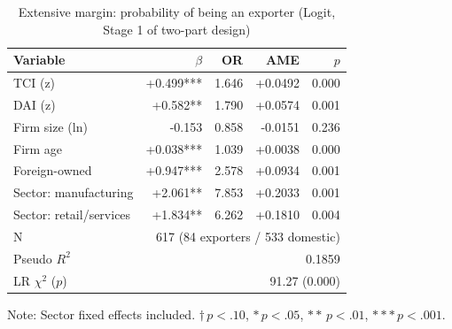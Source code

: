 \begin{table}[ht]
\centering
\caption{Extensive margin: probability of being an exporter (Logit, Stage 1 of two-part design)}
\label{tab:extensive}
\begin{tabular}{lrrrr}
\toprule
Variable & $\beta$ & OR & AME & $p$ \\
\midrule
TCI (z) & +0.499*** & 1.646 & +0.0492 & 0.000 \\
DAI (z) & +0.582** & 1.790 & +0.0574 & 0.001 \\
Firm size (ln) & -0.153 & 0.858 & -0.0151 & 0.236 \\
Firm age & +0.038*** & 1.039 & +0.0038 & 0.000 \\
Foreign-owned & +0.947*** & 2.578 & +0.0934 & 0.001 \\
Sector: manufacturing & +2.061** & 7.853 & +0.2033 & 0.001 \\
Sector: retail/services & +1.834** & 6.262 & +0.1810 & 0.004 \\
\midrule
N & \multicolumn{4}{r}{617 (84 exporters / 533 domestic)} \\
Pseudo $R^2$ & \multicolumn{4}{r}{0.1859} \\
LR $\chi^2$ ($p$) & \multicolumn{4}{r}{91.27 (0.000)} \\
\bottomrule
\end{tabular}
\par\smallskip
\footnotesize Note: Sector fixed effects included. $\dagger\,p<.10$, $*\,p<.05$, $**\,p<.01$, $***\,p<.001$.
\end{table}